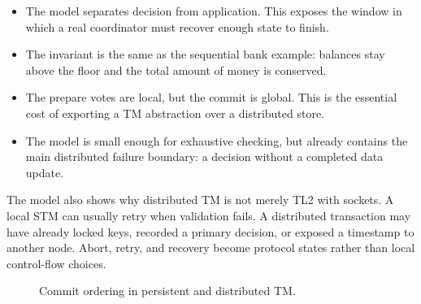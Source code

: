 \begin{itemize}
    \item The model separates decision from application. This exposes the window in which a real coordinator must recover enough state to finish.
    \item The invariant is the same as the sequential bank example: balances stay above the floor and the total amount of money is conserved.
    \item The prepare votes are local, but the commit is global. This is the essential cost of exporting a TM abstraction over a distributed store.
    \item The model is small enough for exhaustive checking, but already contains the main distributed failure boundary: a decision without a completed data update.
\end{itemize}

The model also shows why distributed TM is not merely TL2 with sockets. A local
STM can usually retry when validation fails. A distributed transaction may have
already locked keys, recorded a primary decision, or exposed a timestamp to
another node. Abort, retry, and recovery become protocol states rather than
local control-flow choices.

\begin{figure}[htbp]
\centering
{}
\caption{Commit ordering in persistent and distributed TM.}
\label{fig:persistent-distributed-commit-order}
\end{figure}


